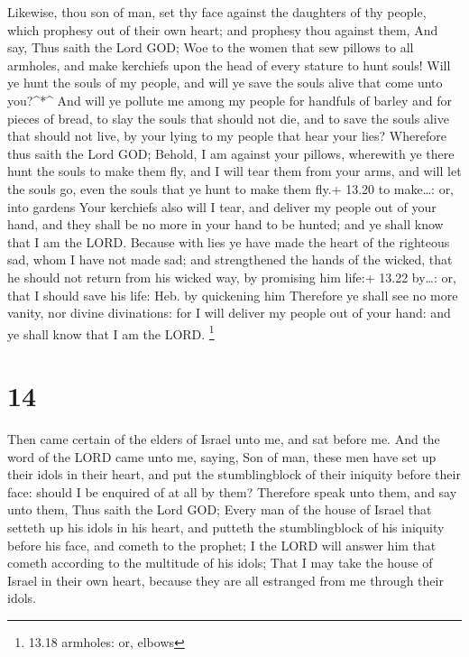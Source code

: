  Likewise, thou son of man, set thy face against the
daughters of thy people, which prophesy out of their own heart; and
prophesy thou against them,  And say, Thus saith the Lord
GOD; Woe to the women that sew pillows to all armholes, and make
kerchiefs upon the head of every stature to hunt souls! Will ye hunt the
souls of my people, and will ye save the souls alive that come unto
you?\^{}*\^{}  And will ye pollute me among my people for
handfuls of barley and for pieces of bread, to slay the souls that
should not die, and to save the souls alive that should not live, by
your lying to my people that hear your lies?  Wherefore
thus saith the Lord GOD; Behold, I am against your pillows, wherewith ye
there hunt the souls to make them fly, and I will tear them from your
arms, and will let the souls go, even the souls that ye hunt to make
them fly.+ 13.20 to make\ldots: or, into gardens  Your
kerchiefs also will I tear, and deliver my people out of your hand, and
they shall be no more in your hand to be hunted; and ye shall know that
I am the LORD.  Because with lies ye have made the heart of
the righteous sad, whom I have not made sad; and strengthened the hands
of the wicked, that he should not return from his wicked way, by
promising him life:+ 13.22 by\ldots: or, that I should save his life:
Heb. by quickening him  Therefore ye shall see no more
vanity, nor divine divinations: for I will deliver my people out of your
hand: and ye shall know that I am the LORD. \footnote{13.18 armholes:
  or, elbows}

\hypertarget{section-13}{%
\section{14}\label{section-13}}

 Then came certain of the elders of Israel unto me, and sat
before me.  And the word of the LORD came unto me, saying,
 Son of man, these men have set up their idols in their
heart, and put the stumblingblock of their iniquity before their face:
should I be enquired of at all by them?  Therefore speak
unto them, and say unto them, Thus saith the Lord GOD; Every man of the
house of Israel that setteth up his idols in his heart, and putteth the
stumblingblock of his iniquity before his face, and cometh to the
prophet; I the LORD will answer him that cometh according to the
multitude of his idols;  That I may take the house of Israel
in their own heart, because they are all estranged from me through their
idols.

